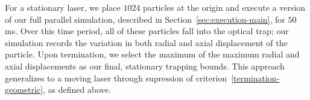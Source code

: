 For a stationary laser, we place $1024$ particles at the origin and
execute a version of our full parallel simulation, described in
Section~\ref{sec:execution-main}, for $50$ms.  Over this time period,
all of these particles fall into the optical trap; our simulation
records the variation in both radial and axial displacement of the
particle.  Upon termination, we select the maximum of the maximum
radial and axial displacements as our final, stationary trapping
bounds.  This approach generalizes to a moving laser through
supression of criterion~\ref{termination-geometric}, as defined above.

%
